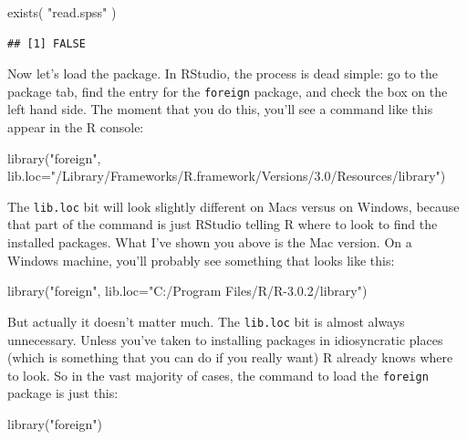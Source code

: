\documentclass[
]{book}
\newenvironment{Shaded}{\begin{snugshade}}{\end{snugshade}}
\newcommand{\AttributeTok}[1]{\textcolor[rgb]{0.77,0.63,0.00}{#1}}
\newcommand{\FunctionTok}[1]{\textcolor[rgb]{0.00,0.00,0.00}{#1}}
\newcommand{\NormalTok}[1]{#1}
\newcommand{\StringTok}[1]{\textcolor[rgb]{0.31,0.60,0.02}{#1}}
\begin{document}
\begin{Shaded}
\begin{Highlighting}[]
\FunctionTok{exists}\NormalTok{( }\StringTok{"read.spss"}\NormalTok{ )}
\end{Highlighting}
\end{Shaded}

\begin{verbatim}
## [1] FALSE
\end{verbatim}

Now let's load the package. In RStudio, the process is dead simple: go to the package tab, find the entry for the \texttt{foreign} package, and check the box on the left hand side. The moment that you do this, you'll see a command like this appear in the R console:

\begin{Shaded}
\begin{Highlighting}[]
\FunctionTok{library}\NormalTok{(}\StringTok{"foreign"}\NormalTok{, }\AttributeTok{lib.loc=}\StringTok{"/Library/Frameworks/R.framework/Versions/3.0/Resources/library"}\NormalTok{)}
\end{Highlighting}
\end{Shaded}

The \texttt{lib.loc} bit will look slightly different on Macs versus on Windows, because that part of the command is just RStudio telling R where to look to find the installed packages. What I've shown you above is the Mac version. On a Windows machine, you'll probably see something that looks like this:

\begin{Shaded}
\begin{Highlighting}[]
\FunctionTok{library}\NormalTok{(}\StringTok{"foreign"}\NormalTok{, }\AttributeTok{lib.loc=}\StringTok{"C:/Program Files/R/R{-}3.0.2/library"}\NormalTok{)}
\end{Highlighting}
\end{Shaded}

But actually it doesn't matter much. The \texttt{lib.loc} bit is almost always unnecessary. Unless you've taken to installing packages in idiosyncratic places (which is something that you can do if you really want) R already knows where to look. So in the vast majority of cases, the command to load the \texttt{foreign} package is just this:

\begin{Shaded}
\begin{Highlighting}[]
\FunctionTok{library}\NormalTok{(}\StringTok{"foreign"}\NormalTok{)}
\end{Highlighting}
\end{Shaded}
\end{document}
